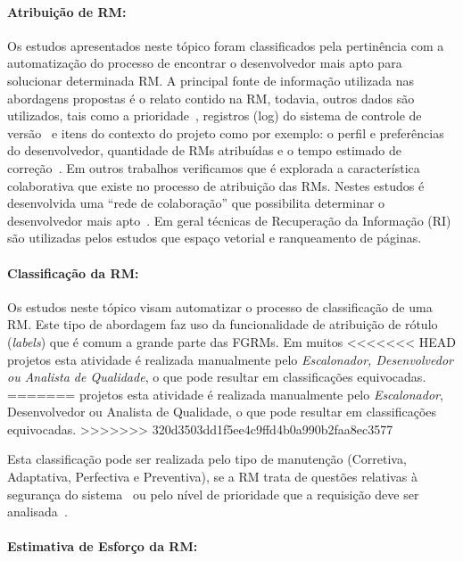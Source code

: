 \paragraph{Atribuição de RM:}

Os estudos apresentados neste tópico foram classificados pela pertinência com a
automatização do processo de encontrar o desenvolvedor mais apto para solucionar
determinada RM\@. A principal fonte de informação utilizada nas abordagens
propostas é o relato contido na RM, todavia, outros dados são utilizados, tais
como a prioridade~\cite{tian2015automated}, registros (log) do sistema de
controle de versão~\cite{shokripour2012automatic, Hu:2014:EBT:2707683.2708297} e
itens do contexto do projeto como por exemplo: o perfil e preferências do
desenvolvedor, quantidade de RMs atribuídas e o tempo estimado de
correção~\cite{hosseini2012market}. Em outros trabalhos verificamos que é
explorada a característica colaborativa que existe no processo de atribuição
das RMs. Nestes estudos é desenvolvida uma ``rede de colaboração'' que
possibilita determinar o desenvolvedor mais apto~\cite{Zhang2014,Zanetti2013,
    Wu2011}.  Em geral técnicas de Recuperação da Informação (RI) são
utilizadas pelos estudos que espaço vetorial e ranqueamento de páginas.

\paragraph{Classificação da RM:}

Os estudos neste tópico visam automatizar o processo de clas\-si\-fi\-ca\-ção
de uma RM\@. Este tipo de abordagem faz uso da funcionalidade de atribuição de
rótulo (\textit{labels}) que é comum  a grande parte das FGRMs. Em muitos
<<<<<<< HEAD
projetos esta atividade é realizada manualmente pelo \textit{Escalonador,
    Desenvolvedor ou Analista de Qualidade}, o que pode resultar em
classificações equivocadas.
=======
projetos esta atividade é realizada manualmente pelo \textit{Escalonador},
Desenvolvedor ou Analista de Qualidade, o que pode resultar em classificações
equivocadas.
>>>>>>> 320d3503dd1f5ee4c9ffd4b0a990b2faa8ec3577

Esta classificação pode ser realizada pelo tipo de manutenção (Corretiva,
Adaptativa, Perfectiva e Preventiva), se a RM trata de questões relativas à
segurança do sistema~\cite{gegick2010identifying, behl2014bug} ou pelo nível de
prioridade que a requisição deve ser analisada~\cite{behl2014bug}.

\paragraph{Estimativa de Esforço da RM:}

